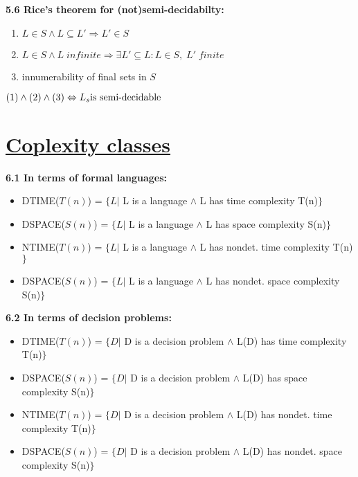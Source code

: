 \documentclass{article}
\begin{document}
\begin{multicols}{2}
\textbf{5.6 Rice's theorem for (not)semi-decidabilty:}
\begin{enumerate}
    \setlength\itemsep{-0.4em}
    \item $L \in S \wedge L \subseteq L' \Rightarrow L' \in S$
    \item $L \in S \wedge L\; infinite \Rightarrow \exists L' \subseteq L: L \in S,\; L'\; finite$
    \item innumerability of final sets in $S$
\end{enumerate}
\begin{center}
    \begin{math}
        (1) \wedge (2) \wedge (3) \Leftrightarrow L_s $is semi-decidable$
    \end{math}
\end{center}


\section{\underline{Coplexity classes}}

\textbf{6.1 In terms of formal languages:}
\begin{itemize}
    \setlength\itemsep{-0.4em}
    \item DTIME($T(n)$)  = $\{ L |$ L is a language $\wedge$ L has time complexity T(n)$\}$
    \item DSPACE($S(n)$) = $\{ L |$ L is a language $\wedge$ L has space complexity S(n)$\}$
    \item NTIME($T(n)$)  = $\{ L |$ L is a language $\wedge$ L has nondet. time complexity T(n)$\}$
    \item DSPACE($S(n)$) = $\{ L |$ L is a language $\wedge$ L has nondet. space complexity S(n)$\}$
\end{itemize}

\textbf{6.2 In terms of decision problems:}
\begin{itemize}
    \setlength\itemsep{-0.4em}
    \item DTIME($T(n)$)  = $\{ D |$ D is a decision problem $\wedge$ L(D) has time complexity T(n)$\}$
    \item DSPACE($S(n)$) = $\{ D |$ D is a decision problem $\wedge$ L(D) has space complexity S(n)$\}$
    \item NTIME($T(n)$)  = $\{ D |$ D is a decision problem $\wedge$ L(D) has nondet. time complexity T(n)$\}$
    \item DSPACE($S(n)$) = $\{ D |$ D is a decision problem $\wedge$ L(D) has nondet. space complexity S(n)$\}$
\end{itemize}


\end{multicols}
\end{document}
